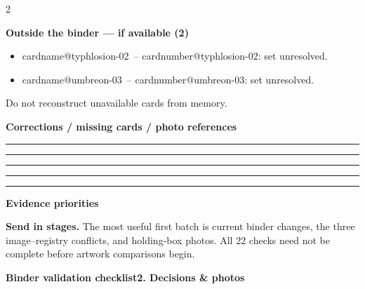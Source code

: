 \documentclass[10pt,a4paper]{article}
\makeatletter
\newcommand{\sub}[1]{\par\vspace{3pt}\textbf{#1}\par}
\newcommand{\id}[1]{\csname cardnumber@#1\endcsname}
\newcommand{\card}[1]{\csname cardname@#1\endcsname\ -- \id{#1}}
\newcommand{\blank}{\rule{\linewidth}{0.25pt}}
\makeatother
\begin{document}
\begin{multicols}{2}
\sub{Outside the binder --- if available (2)}
\begin{itemize}
\item \card{typhlosion-02}: set unresolved.
\item \card{umbreon-03}: set unresolved.
\end{itemize}
Do not reconstruct unavailable cards from memory.

\sub{Corrections / missing cards / photo references}
\blank\par\blank\par\blank\par\blank\par\blank

\sub{Evidence priorities}
\textbf{Send in stages.} The most useful first batch is current binder changes, the three image--registry conflicts, and holding-box photos. All 22 checks need not be complete before artwork comparisons begin.
\end{multicols}

\newpage
{\LARGE\bfseries Binder validation checklist}\hfill{\bfseries 2. Decisions \& photos}
\end{document}
